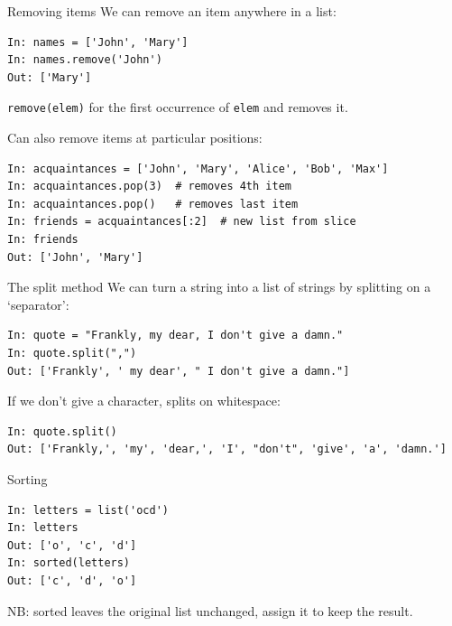 \documentclass[aspectratio=169,usenames,dvipsnames]{beamer}
\begin{document}
\begin{frame}[fragile]{Removing items}
We can remove an item anywhere in a list:
\begin{lstlisting} 
In: names = ['John', 'Mary']
In: names.remove('John')
Out: ['Mary']
\end{lstlisting}

\texttt{remove(elem)}  for the first occurrence of
\texttt{elem} and removes it.

\pause
\vspace{1em}
Can also remove items at particular positions:
\begin{lstlisting} 
In: acquaintances = ['John', 'Mary', 'Alice', 'Bob', 'Max']
In: acquaintances.pop(3)  # removes 4th item
In: acquaintances.pop()   # removes last item
In: friends = acquaintances[:2]  # new list from slice
In: friends
Out: ['John', 'Mary']
\end{lstlisting}

\end{frame}


\begin{frame}[fragile]{The split method}
We can turn a string into a list of strings
by splitting on a `separator':
\begin{lstlisting} 
In: quote = "Frankly, my dear, I don't give a damn."
In: quote.split(",")
Out: ['Frankly', ' my dear', " I don't give a damn."]
\end{lstlisting}

\pause
If we don't give a character, splits on whitespace:
\begin{lstlisting} 
In: quote.split()
Out: ['Frankly,', 'my', 'dear,', 'I', "don't", 'give', 'a', 'damn.']
\end{lstlisting}
\end{frame}


\begin{frame}[fragile]{Sorting}
\begin{lstlisting} 
In: letters = list('ocd')
In: letters
Out: ['o', 'c', 'd']
In: sorted(letters)
Out: ['c', 'd', 'o']
\end{lstlisting}

NB: sorted leaves the original list unchanged,
assign it to keep the result.
\end{frame}
\end{document}
